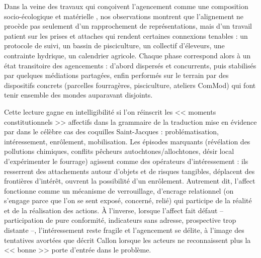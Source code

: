 \documentclass{article}
\begin{document}
Dans la veine des travaux qui conçoivent l’agencement comme une composition socio-écologique et matérielle \parencite{hertz_knowledge_2025}, nos observations montrent que l’alignement ne procède pas seulement d’un rapprochement de représentations, mais d’un travail patient sur les prises et attaches qui rendent certaines connexions tenables : un protocole de suivi, un bassin de pisciculture, un collectif d’éleveurs, une contrainte hydrique, un calendrier agricole. Chaque phase correspond alors à un état transitoire des agencements : d’abord dispersés et concurrents, puis stabilisés par quelques médiations partagées, enfin performés sur le terrain par des dispositifs concrets (parcelles fourragères, pisciculture, ateliers ComMod) qui font tenir ensemble des mondes auparavant disjoints.

Cette lecture gagne en intelligibilité si l’on réinscrit les << moments constitutionnels >> affectifs dans la grammaire de la traduction mise en évidence par \textcite{callon_techno-economic_1990} dans le célèbre cas des coquilles Saint-Jacques : problématisation, intéressement, enrôlement, mobilisation. Les épisodes marquants (révélation des pollutions chimiques, conflits pêcheurs autochtones/allochtones, désir local d’expérimenter le fourrage) agissent comme des opérateurs d’intéressement : ils resserrent des attachements autour d’objets et de risques tangibles, déplacent des frontières d’intérêt, ouvrent la possibilité d’un enrôlement. Autrement dit, l’affect fonctionne comme un mécanisme de verrouillage, d'encrage relationnel (on s’engage parce que l’on se sent exposé, concerné, relié) qui participe de la réalité et de la réalisation des actions. À l’inverse, lorsque l’affect fait défaut -- participation de pure conformité, indicateurs sans adresse, prospective trop distante --, l’intéressement reste fragile et l’agencement se délite, à l’image des tentatives avortées que décrit Callon lorsque les acteurs ne reconnaissent plus la << bonne >> porte d’entrée dans le problème.
\end{document}
